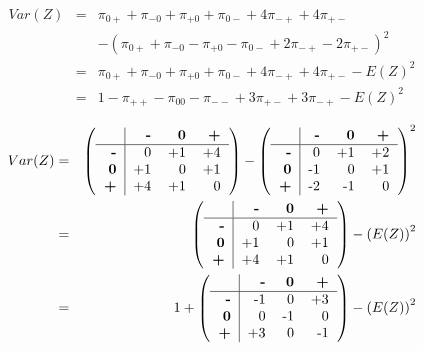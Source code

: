 \documentclass[12pt,a4paper,oneside]{book}
\begin{document}

\begin{eqnarray}
Var(Z) &=& \pi_{0+} + \pi_{-0} + \pi_{+0} + \pi_{0-} +4\pi_{-+} +4\pi_{+-} \nonumber \nonumber \\ 
&&	- (\pi_{0+} + \pi_{-0} - \pi_{+0} - \pi_{0-} +2\pi_{-+} -2\pi_{+-})^2 \nonumber \\
&=& \pi_{0+} + \pi_{-0} + \pi_{+0} + \pi_{0-} +4\pi_{-+} +4\pi_{+-} - E(Z)^2 \nonumber \\
&=& 1 - \pi_{++} - \pi_{00} - \pi_{--} + 3\pi_{+-} + 3\pi_{-+} - E(Z)^2
\end{eqnarray}

\begin{eqnarray*}
Var(Z) &=& 
\left(\begin{tabular}{r|r r r}
    			& \textbf{-} & \textbf{0} & \textbf{+} \\\hline
    \textbf{-} 	& 0		& +1	& +4	\\
    \textbf{0} 	& +1	& 0		& +1	\\
    \textbf{+} 	& +4	& +1	& 0		\\
\end{tabular} \right)
- \left(
\begin{tabular}{r|r r r}
    			& \textbf{-} & \textbf{0} & \textbf{+} \\\hline
    \textbf{-} 	& 0		& +1	& +2	\\
    \textbf{0} 	& -1	& 0		& +1	\\
    \textbf{+} 	& -2	& -1	& 0		\\
\end{tabular}
\right)^2  \\
&=& \left( \begin{tabular}{r|r r r}
    			& \textbf{-} & \textbf{0} & \textbf{+} \\\hline
    \textbf{-} 	& 0		& +1	& +4	\\
    \textbf{0} 	& +1	& 0		& +1	\\
    \textbf{+} 	& +4	& +1	& 0		\\
\end{tabular} \right)
- \left(E(Z)\right)^2 	\\
&=& 1 +  \left(\begin{tabular}{r|r r r}
    			& \textbf{-} & \textbf{0} & \textbf{+} \\\hline
    \textbf{-} 	& -1	& 0		& +3	\\
    \textbf{0} 	& 0		& -1	& 0	\\
    \textbf{+} 	& +3	& 0		& -1		\\
\end{tabular} \right)
 - \left(E(Z)\right)^2	\\
\end{eqnarray*}
\end{document}
